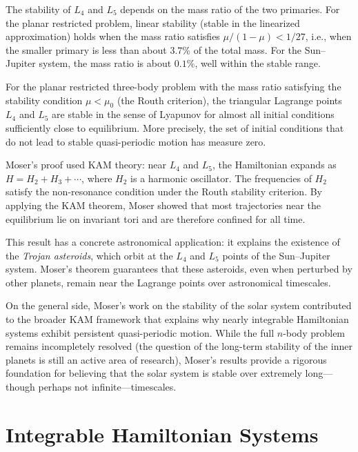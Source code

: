 The stability of $L_4$ and $L_5$ depends on the mass ratio of the two primaries. For the planar restricted problem, linear stability (stable in the linearized approximation) holds when the mass ratio satisfies $\mu / (1-\mu) < 1/27$, i.e., when the smaller primary is less than about $3.7\%$ of the total mass. For the Sun--Jupiter system, the mass ratio is about $0.1\%$, well within the stable range.

\begin{theorem}[Moser, 1958]
For the planar restricted three-body problem with the mass ratio satisfying the stability condition $\mu < \mu_0$ (the Routh criterion), the triangular Lagrange points $L_4$ and $L_5$ are stable in the sense of Lyapunov for almost all initial conditions sufficiently close to equilibrium. More precisely, the set of initial conditions that do not lead to stable quasi-periodic motion has measure zero.
\end{theorem}

Moser's proof used KAM theory: near $L_4$ and $L_5$, the Hamiltonian expands as $H = H_2 + H_3 + \cdots$, where $H_2$ is a harmonic oscillator. The frequencies of $H_2$ satisfy the non-resonance condition under the Routh stability criterion. By applying the KAM theorem, Moser showed that most trajectories near the equilibrium lie on invariant tori and are therefore confined for all time.

This result has a concrete astronomical application: it explains the existence of the \textit{Trojan asteroids}, which orbit at the $L_4$ and $L_5$ points of the Sun--Jupiter system. Moser's theorem guarantees that these asteroids, even when perturbed by other planets, remain near the Lagrange points over astronomical timescales.

On the general side, Moser's work on the stability of the solar system contributed to the broader KAM framework that explains why nearly integrable Hamiltonian systems exhibit persistent quasi-periodic motion. While the full $n$-body problem remains incompletely resolved (the question of the long-term stability of the inner planets is still an active area of research), Moser's results provide a rigorous foundation for believing that the solar system is stable over extremely long---though perhaps not infinite---timescales.

\section{Integrable Hamiltonian Systems}

